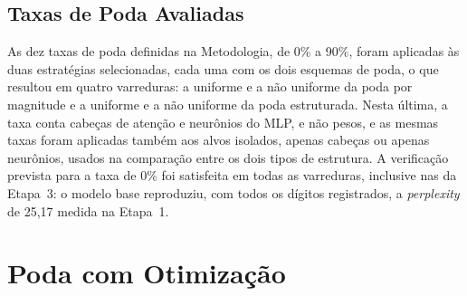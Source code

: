\subsection{Taxas de Poda Avaliadas}\label{subsec:taxas}

As dez taxas de poda definidas na Metodologia, de
0\% a 90\%, foram aplicadas às duas estratégias selecionadas, cada uma com os dois
esquemas de poda, o que resultou em quatro varreduras: a uniforme e a não uniforme da poda por
magnitude e a uniforme e a não uniforme da poda estruturada. Nesta última, a taxa conta
cabeças de atenção e neurônios do MLP, e não pesos,
e as mesmas taxas foram aplicadas também aos alvos isolados, apenas cabeças ou apenas
neurônios, usados na comparação entre os dois tipos de estrutura. A verificação prevista
para a taxa de 0\% foi satisfeita em todas as varreduras, inclusive nas da Etapa~3: o
modelo base reproduziu, com todos os dígitos registrados, a \textit{perplexity} de 25,17
medida na Etapa~1.

\section{Poda com Otimização}\label{sec:estrategia_otimizada}

